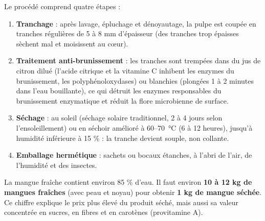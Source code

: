 \documentclass[11pt]{article}
\newcommand{\cle}[1]{{\popxbold\color{popdark}#1}}
\begin{document}
Le procédé comprend quatre étapes :

\begin{enumerate}
\item \textbf{Tranchage} : après lavage, épluchage et dénoyautage, la pulpe est coupée en tranches régulières de 5 à 8 mm d'épaisseur (des tranches trop épaisses sèchent mal et moisissent au cœur).
\item \textbf{Traitement anti-brunissement} : les tranches sont trempées dans du jus de citron dilué (l'acide citrique et la vitamine C inhibent les enzymes du brunissement, les polyphénoloxydases) ou \cle{blanchies} (plongées 1 à 2 minutes dans l'eau bouillante), ce qui détruit les enzymes responsables du brunissement enzymatique et réduit la flore microbienne de surface.
\item \textbf{Séchage} : au soleil (séchage solaire traditionnel, 2 à 4 jours selon l'ensoleillement) ou en \cle{séchoir} amélioré à 60--\SI{70}{\celsius} (6 à 12 heures), jusqu'à humidité inférieure à 15 \% : la tranche devient souple, non collante.
\item \textbf{Emballage hermétique} : sachets ou bocaux étanches, à l'abri de l'air, de l'humidité et des insectes.
\end{enumerate}

\begin{exemplebox}
La mangue fraîche contient environ 85 \% d'eau. Il faut environ \textbf{10 à 12 kg de mangues fraîches} (avec peau et noyau) pour obtenir \textbf{1 kg de mangue séchée}. Ce chiffre explique le prix plus élevé du produit séché, mais aussi sa valeur concentrée en sucres, en fibres et en carotènes (provitamine A).
\end{exemplebox}
\end{document}

